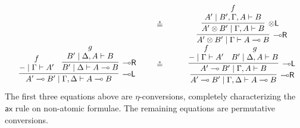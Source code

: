 \documentclass[sn-mathphys-num]{sn-jnl}%
\newcommand{\GG}{\Gamma}
\newcommand{\GD}{\Delta}
\newcommand{\vd}{\vdash}
\newcommand{\tl}{\otimes \mathsf{L}}
\newcommand{\tr}{\otimes\mathsf{R}}
\newcommand{\pass}{\mathsf{pass}}
\newcommand{\unitl}{\mathsf{IL}}
\newcommand{\unitr}{\mathsf{IR}}
\newcommand{\ax}{\mathsf{ax}}
\newcommand{\ot}{\otimes}
\newcommand{\lolli}{\multimap}
\newcommand{\lleft}{{\lolli}\mathsf{L}}
\newcommand{\lright}{{\lolli}\mathsf{R}}
\newcommand{\I}{\mathsf{I}}
\newcommand{\proofbox}[1]{\begin{tabular}{l} #1 \end{tabular}}
\theoremstyle{thmstyleone}%
\theoremstyle{thmstyletwo}%
\theoremstyle{thmstylethree}%
\begin{document}
\begin{displaymath}
\begin{array}{ccc}
{{{      }
    }
  }
  \quad
  &\circeq&
  \quad
  \proofbox{
    \infer[\lright]{A' \ot B' \mid \GG \vd A \lolli B}{
      \infer[\tl]{A' \ot B' \mid \GG , A \vd B}{
        \deduce{A' \mid B' , \GG , A \vd B}{f}
      }
    }
  }
  \\[15pt]
  \proofbox{
    \infer[\lleft]{A' \lolli B' \mid \GG , \GD \vd A \lolli B}{
      \deduce{{-} \mid \GG \vd A'}{f}
      &
      \infer[\lright]{B' \mid \GD \vd A \lolli B}{
        \deduce{B' \mid \GD , A \vd B}{g}
      }
    }
  }
  \quad
  &\circeq&
  \quad
  \proofbox{
    \infer[\lright]{A' \lolli B' \mid \GG , \GD \vd A \lolli B}{
      \infer[\lleft]{A' \lolli B' \mid \GG , A \vd B}{
        \deduce{{-} \mid \GG \vd A'}{f}
        &
        \deduce{B' \mid \GD , A \vd B}{g}
      }
    }
  }
\end{array}
\end{displaymath}
The first three equations above are $\eta$-conversions, completely characterizing the $\ax$ rule on non-atomic formulae. The remaining equations are permutative conversions.
\end{document}
